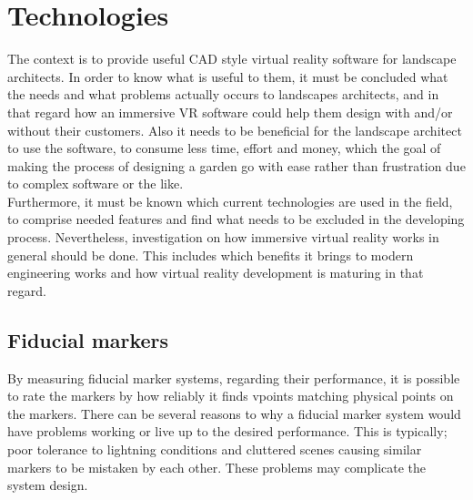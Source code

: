 	\section{Technologies}\label{sec:technologies}
		The context is to provide useful CAD style virtual reality software for landscape architects. In order to know what is useful to them, it must be concluded what the needs and what problems actually occurs to landscapes architects, and in that regard how an immersive VR software could help them design with and/or without their customers. Also it needs to be beneficial for the landscape architect to use the software, to consume less time, effort and money, which the goal of making the process of designing a garden go with ease rather than frustration due to complex software or the like. \\
	
		Furthermore, it must be known which current technologies are used in the field, to comprise needed features and find what needs to be excluded in the developing process. Nevertheless, investigation on how immersive virtual reality works in general should be done. This includes which benefits it brings to modern engineering works and how virtual reality development is maturing in that regard.		

			\subsection{Fiducial markers}\label{sec:fiducialMarkers}
				By measuring fiducial marker systems, regarding their performance, it is possible to rate the markers by how reliably it finds vpoints matching physical points on the markers. There can be several reasons to why a fiducial marker system would have problems working or live up to the desired performance. This is typically; poor tolerance to lightning conditions and cluttered scenes causing similar markers to be mistaken by each other\cite{fiducialMarkers}. These problems may complicate the system design.\\
				
